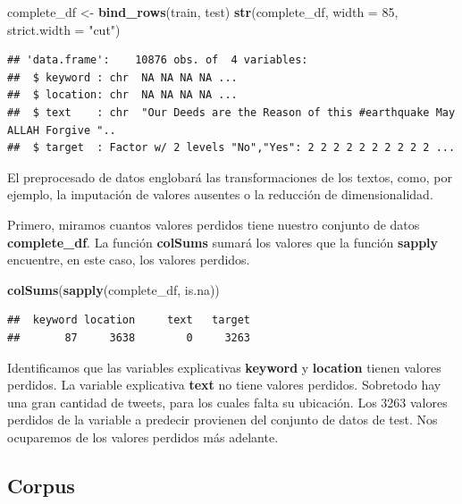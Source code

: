 \documentclass[
]{article}
\newenvironment{Shaded}{\begin{snugshade}}{\end{snugshade}}
\newcommand{\DataTypeTok}[1]{\textcolor[rgb]{0.13,0.29,0.53}{#1}}
\newcommand{\DecValTok}[1]{\textcolor[rgb]{0.00,0.00,0.81}{#1}}
\newcommand{\KeywordTok}[1]{\textcolor[rgb]{0.13,0.29,0.53}{\textbf{#1}}}
\newcommand{\NormalTok}[1]{#1}
\newcommand{\StringTok}[1]{\textcolor[rgb]{0.31,0.60,0.02}{#1}}
\begin{document}
\begin{Shaded}
\begin{Highlighting}[]
\NormalTok{complete_df <-}\StringTok{ }\KeywordTok{bind_rows}\NormalTok{(train, test)}
\KeywordTok{str}\NormalTok{(complete_df, }\DataTypeTok{width =} \DecValTok{85}\NormalTok{, }\DataTypeTok{strict.width =} \StringTok{"cut"}\NormalTok{)}
\end{Highlighting}
\end{Shaded}

\begin{verbatim}
## 'data.frame':    10876 obs. of  4 variables:
##  $ keyword : chr  NA NA NA NA ...
##  $ location: chr  NA NA NA NA ...
##  $ text    : chr  "Our Deeds are the Reason of this #earthquake May ALLAH Forgive "..
##  $ target  : Factor w/ 2 levels "No","Yes": 2 2 2 2 2 2 2 2 2 2 ...
\end{verbatim}

El preprocesado de datos englobará las transformaciones de los textos,
como, por ejemplo, la imputación de valores ausentes o la reducción de
dimensionalidad.

Primero, miramos cuantos valores perdidos tiene nuestro conjunto de
datos \textbf{complete\_df}. La función \textbf{colSums} sumará los
valores que la función \textbf{sapply} encuentre, en este caso, los
valores perdidos.

\begin{Shaded}
\begin{Highlighting}[]
\KeywordTok{colSums}\NormalTok{(}\KeywordTok{sapply}\NormalTok{(complete_df, is.na))}
\end{Highlighting}
\end{Shaded}

\begin{verbatim}
##  keyword location     text   target 
##       87     3638        0     3263
\end{verbatim}

Identificamos que las variables explicativas \textbf{keyword} y
\textbf{location} tienen valores perdidos. La variable explicativa
\textbf{text} no tiene valores perdidos. Sobretodo hay una gran cantidad
de tweets, para los cuales falta su ubicación. Los 3263 valores perdidos
de la variable a predecir provienen del conjunto de datos de test. Nos
ocuparemos de los valores perdidos más adelante.

\hypertarget{corpus}{%
\subsection{Corpus}\label{corpus}}
\end{document}
